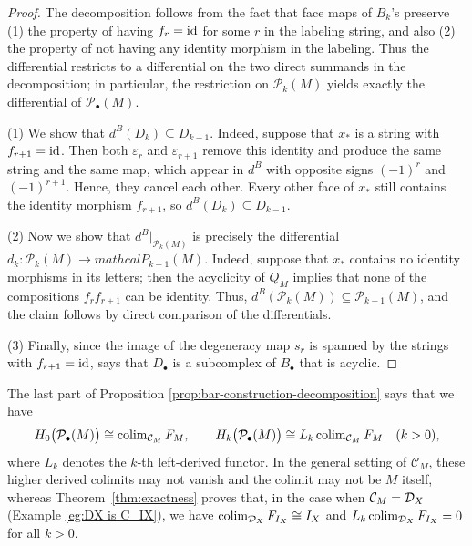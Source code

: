 \documentclass[a4paper,leqno]{amsart}
\begin{document}
\begin{proof}
The decomposition follows from the fact that face maps of $B_k$'s preserve (1) the property of having $f_r=\operatorname{id}$ for some $r$ in the labeling string, and also (2) the property of not having any identity morphism in the labeling.
Thus the differential restricts to a differential on the two direct summands in the decomposition; in particular, the restriction on $\mathcal{P}_k(M)$ yields exactly the differential of $\mathcal{P}_\bullet(M)$.

(1) We show that $d^B(D_k)\subseteq D_{k-1}$.  Indeed, suppose that $x_\ast$ is a string with $f_{r+1}=\operatorname{id}$. Then both $\varepsilon_r$ and $\varepsilon_{r+1}$ remove this identity and produce the same string and the same map, which appear in $d^B$ with opposite signs $(-1)^r$ and $(-1)^{r+1}$.  Hence, they cancel each other.  Every other face of $x_\ast$ still contains the identity morphism $f_{r+1}$, so $d^B(D_k)\subseteq D_{k-1}$.

(2) Now we show that $d^B|_{\mathcal{P}_k(M)}$ is precisely the differential $d_k:\mathcal{P}_k(M)\to mathcal{P}_{k-1}(M)$.  Indeed, suppose that $x_\ast$ contains no identity morphisms in its letters; then the acyclicity of $Q_M$ implies that none of the compositions $f_rf_{r+1}$ can be identity.  Thus, $d^B(\mathcal{P}_k(M))\subseteq \mathcal{P}_{k-1}(M)$, and the claim follows by direct comparison of the differentials.

(3) Finally, since the image of the degeneracy map $s_r$ is spanned by the strings with $f_{r+1}=\operatorname{id}$, \cite[\S8.3]{Wei94} says that $D_\bullet$ is a subcomplex of $B_\bullet$ that is acyclic.
\end{proof}


The last part of Proposition \ref{prop:bar-construction-decomposition} says that we have
\begin{equation*}
H_0\bigl(\mathcal P_\bullet(M)\bigr)
\cong\operatorname{colim}_{\mathcal C_M}F_M,
\qquad
H_k\bigl(\mathcal P_\bullet(M)\bigr)
\cong L_k\operatorname{colim}_{\mathcal C_M}F_M
\quad(k>0),
\end{equation*}
where $L_k$ denotes the $k$-th left-derived functor. In the general setting of $\mathcal{C}_M$, these higher derived colimits may not vanish and the colimit may not be $M$ itself, whereas Theorem~\ref{thm:exactness} proves that, in the case when $\mathcal{C}_M=\mathcal D_X$ (Example \ref{eg:DX is C_IX}), we have $\operatorname{colim}_{\mathcal D_X} F_{I_X} \cong I_X$ and $L_k\operatorname{colim}_{\mathcal D_X} F_{I_X}=0$ for all $k>0$.

\end{document}
